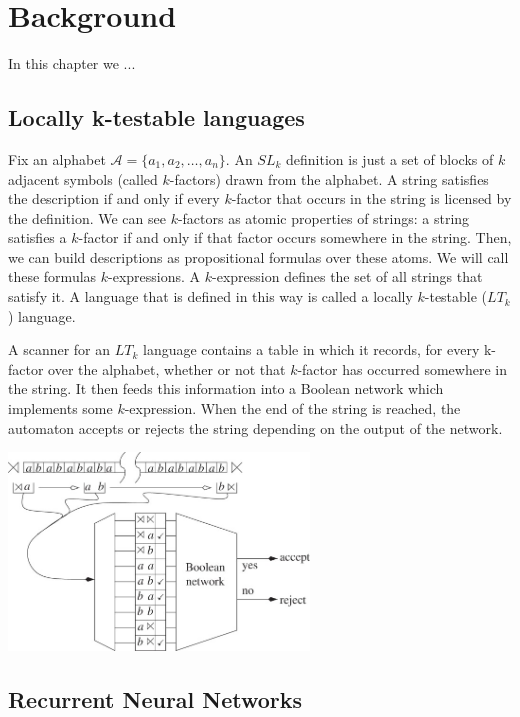 \documentclass[titlepage]{report}
\begin{document}
\chapter{Background}

In this chapter we ...

\section{Locally k-testable languages}

Fix an alphabet $\mathcal{A} = \{ a_1, a_2, \ldots, a_n \}$. An $SL_k$ definition is just a set of blocks of $k$ adjacent symbols (called $k$-factors) drawn from the alphabet. A string satisfies the description if and only if every $k$-factor that occurs in the string is licensed by the definition. We can see $k$-factors as atomic properties of strings: a string satisfies a $k$-factor if and only if that factor occurs somewhere in the string. Then, we can build descriptions as propositional formulas over these atoms. We will call these formulas $k$-expressions. A $k$-expression defines the set of all strings that satisfy it. A language that is defined in this way is called a locally $k$-testable ($LT_k$) language.
\par
A scanner for an $LT_k$ language contains a table in which it records, for every k-factor over the alphabet, whether or not that $k$-factor has occurred somewhere in the string. It then feeds this information into a Boolean network which implements some $k$-expression. When the end of the string is reached, the automaton accepts or rejects the string depending on the output of the network.

\begin{center}
\includegraphics[width=80mm]{figures/locally_k-testable.jpg}
\end{center}

\section{Recurrent Neural Networks}
\end{document}

